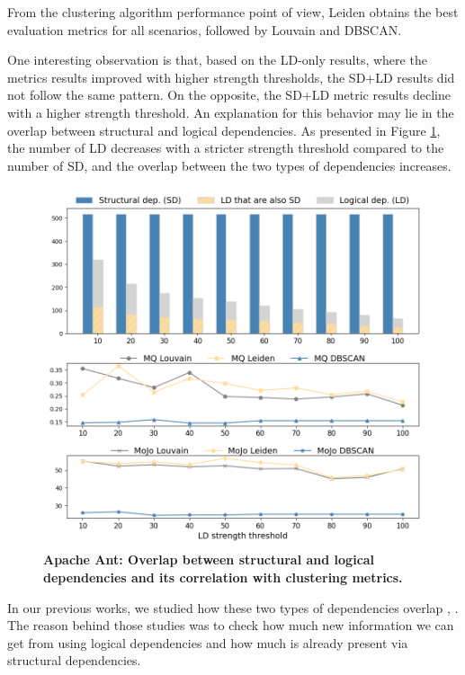 \documentclass[12pt, a4paper, twoside]{report}
\begin{document}
From the clustering algorithm performance point of view, Leiden obtains the best evaluation metrics for all scenarios, followed by Louvain and DBSCAN.

One interesting observation is that, based on the LD-only results, where the metrics results improved with higher strength thresholds, the SD+LD results did not follow the same pattern. On the opposite, the SD+LD metric results decline with a higher strength threshold. An explanation for this behavior may lie in the overlap between structural and logical dependencies. As presented in Figure \ref{fig:ant_correlation}, the number of LD decreases with a stricter strength threshold compared to the number of SD, and the overlap between the two types of dependencies increases.

\begin{figure}[t!]
\centering
\includegraphics[width=\columnwidth]{ant_correlation.png}
\caption{\textbf{Apache Ant: Overlap between structural and logical dependencies and its correlation with clustering metrics.}}
\label{fig:ant_correlation}
\end{figure}

In our previous works, we studied how these two types of dependencies overlap \cite{b4}, \cite{b5}. The reason behind those studies was to check how much new information we can get from using logical dependencies and how much is already present via structural dependencies.
\end{document}
